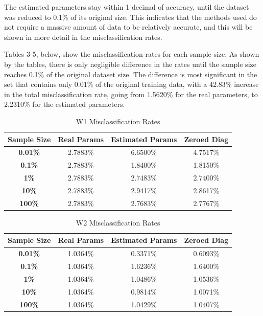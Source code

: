 \documentclass{article}
\begin{document}
\noindent The estimated parameters stay within 1 decimal of accuracy, until the dataset was reduced to 0.1\% of its original size. This indicates
that the methods used do not require a massive amount of data to be relatively accurate, and this will be shown in more detail in the 
misclassification rates.  

\noindent Tables 3-5, below, show the misclassification rates for each sample size. As shown by the tables, there is only negligible difference in the rates until the 
sample size reaches 0.1\% of the original dataset size. The difference is most significant in the set that contains only 0.01\% 
of the original training data, with a 42.83\% increase in the total misclassification rate, going from 1.5620\% for 
the real parameters, to 2.2310\% for the estimated parameters. 

\begin{table}[H]
\centering
\small
\caption{W1 Misclassification Rates}
\vspace{-0.4em}
\begin{tabular}{cccc}
\toprule
\textbf{Sample Size} & \textbf{Real Params} & \textbf{Estimated Params} & \textbf{Zeroed Diag} \\
\midrule
\textbf{0.01\%} & 2.7883\% & 6.6500\% & 4.7517\% \\
\textbf{0.1\%} & 2.7883\% & 1.8400\% & 1.8150\% \\
\textbf{1\%} & 2.7883\% & 2.7483\% & 2.7400\% \\
\textbf{10\%} & 2.7883\% & 2.9417\% & 2.8617\% \\
\textbf{100\%} & 2.7883\% & 2.7683\% & 2.7767\% \\
\bottomrule
\end{tabular}
\end{table}

\begin{table}[H]
\centering
\small
\caption{W2 Misclassification Rates}
\vspace{-0.4em}
\begin{tabular}{cccc}
\toprule
\textbf{Sample Size} & \textbf{Real Params} & \textbf{Estimated Params} & \textbf{Zeroed Diag} \\
\midrule
\textbf{0.01\%} & 1.0364\% & 0.3371\% & 0.6093\% \\
\textbf{0.1\%} & 1.0364\% & 1.6236\% & 1.6400\% \\
\textbf{1\%} & 1.0364\% & 1.0486\% & 1.0536\% \\
\textbf{10\%} & 1.0364\% & 0.9814\% & 1.0071\% \\
\textbf{100\%} & 1.0364\% & 1.0429\% & 1.0407\% \\
\bottomrule
\end{tabular}
\end{table}
\end{document}
